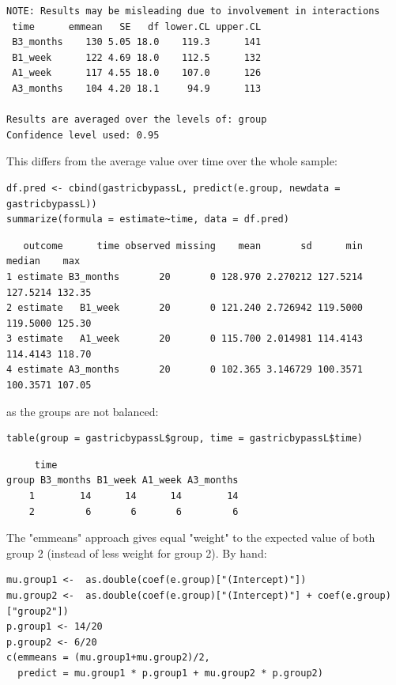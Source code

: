 \documentclass[12pt]{article}
\begin{document}
\begin{verbatim}
NOTE: Results may be misleading due to involvement in interactions
 time      emmean   SE   df lower.CL upper.CL
 B3_months    130 5.05 18.0    119.3      141
 B1_week      122 4.69 18.0    112.5      132
 A1_week      117 4.55 18.0    107.0      126
 A3_months    104 4.20 18.1     94.9      113

Results are averaged over the levels of: group 
Confidence level used: 0.95
\end{verbatim}


This differs from the average value over time over the whole sample:
\lstset{language=r,label= ,caption= ,captionpos=b,numbers=none}
\begin{lstlisting}
df.pred <- cbind(gastricbypassL, predict(e.group, newdata = gastricbypassL))
summarize(formula = estimate~time, data = df.pred)
\end{lstlisting}

\begin{verbatim}
   outcome      time observed missing    mean       sd      min   median    max
1 estimate B3_months       20       0 128.970 2.270212 127.5214 127.5214 132.35
2 estimate   B1_week       20       0 121.240 2.726942 119.5000 119.5000 125.30
3 estimate   A1_week       20       0 115.700 2.014981 114.4143 114.4143 118.70
4 estimate A3_months       20       0 102.365 3.146729 100.3571 100.3571 107.05
\end{verbatim}


as the groups are not balanced:
\lstset{language=r,label= ,caption= ,captionpos=b,numbers=none}
\begin{lstlisting}
table(group = gastricbypassL$group, time = gastricbypassL$time)
\end{lstlisting}

\begin{verbatim}
     time
group B3_months B1_week A1_week A3_months
    1        14      14      14        14
    2         6       6       6         6
\end{verbatim}


The "emmeans" approach gives equal "weight" to the expected value of
both group 2 (instead of less weight for group 2). By hand:
\lstset{language=r,label= ,caption= ,captionpos=b,numbers=none}
\begin{lstlisting}
mu.group1 <-  as.double(coef(e.group)["(Intercept)"])
mu.group2 <-  as.double(coef(e.group)["(Intercept)"] + coef(e.group)["group2"])
p.group1 <- 14/20
p.group2 <- 6/20
c(emmeans = (mu.group1+mu.group2)/2,
  predict = mu.group1 * p.group1 + mu.group2 * p.group2)
\end{lstlisting}
\end{document}
